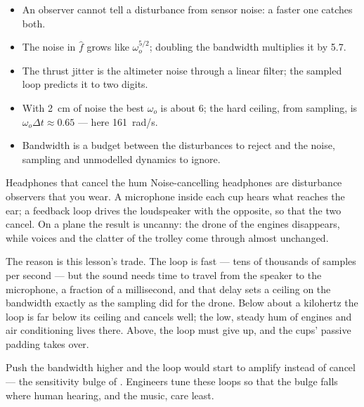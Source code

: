 \begin{remember}
\begin{itemize}
  \item An observer cannot tell a disturbance from sensor noise: a faster one catches both.
  \item The noise in $\hat f$ grows like $\omega_o^{5/2}$; doubling the bandwidth multiplies it by 5.7.
  \item The thrust jitter is the altimeter noise through a linear filter; the sampled loop predicts it to two digits.
  \item With \SI{2}{cm} of noise the best $\omega_o$ is about 6; the hard ceiling, from sampling, is $\omega_o\Delta t \approx 0.65$ — here \SI{161}{rad/s}.
  \item Bandwidth is a budget between the disturbances to reject and the noise, sampling and unmodelled dynamics to ignore.
\end{itemize}
\end{remember}

\begin{curiosity}{Headphones that cancel the hum}
Noise-cancelling headphones are disturbance observers that you wear. A microphone inside each cup hears what reaches the ear; a feedback loop drives the loudspeaker with the opposite, so that the two cancel. On a plane the result is uncanny: the drone of the engines disappears, while voices and the clatter of the trolley come through almost unchanged.

The reason is this lesson's trade. The loop is fast — tens of thousands of samples per second — but the sound needs time to travel from the speaker to the microphone, a fraction of a millisecond, and that delay sets a ceiling on the bandwidth exactly as the sampling did for the drone. Below about a kilohertz the loop is far below its ceiling and cancels well; the low, steady hum of engines and air conditioning lives there. Above, the loop must give up, and the cups' passive padding takes over.

Push the bandwidth higher and the loop would start to amplify instead of cancel — the sensitivity bulge of . Engineers tune these loops so that the bulge falls where human hearing, and the music, care least.
\end{curiosity}


